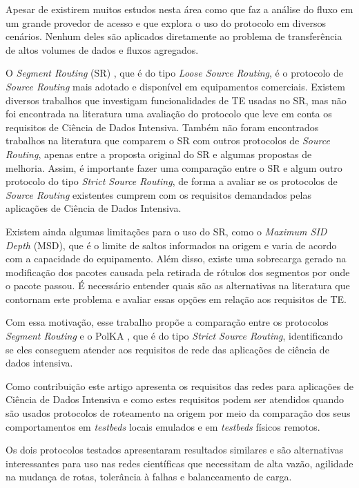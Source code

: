 \documentclass[12pt]{article}
\begin{document}
Apesar de existirem muitos estudos nesta área como \cite{schuller2018traffic} que faz a análise do fluxo em um grande provedor de acesso e \cite{kushwaha2020survey} que explora o uso do protocolo em diversos cenários. Nenhum deles são aplicados diretamente ao problema de transferência de altos volumes de dados e fluxos agregados.
 
O \textit{Segment Routing} (SR) \cite{abdullah2018segment}, que é do tipo \textit{Loose Source Routing}, é o protocolo de \textit{Source Routing} mais adotado e disponível em equipamentos comerciais. Existem diversos trabalhos que investigam funcionalidades de TE usadas no SR, mas não foi encontrada na literatura uma avaliação do protocolo que leve em conta os requisitos de Ciência de Dados Intensiva. 
Também não foram encontrados trabalhos na literatura que comparem o SR com outros protocolos de \textit{Source Routing}, apenas entre a proposta original do SR e algumas propostas de melhoria. 
Assim, é importante fazer uma comparação entre o SR e algum outro protocolo do tipo \textit{Strict Source Routing}, de forma a avaliar se os protocolos de \textit{Source Routing} existentes cumprem com os requisitos demandados pelas aplicações de Ciência de Dados Intensiva.

Existem ainda algumas limitações para o uso do SR, como o \textit{Maximum SID Depth} (MSD), que é o limite de saltos informados na origem e varia de acordo com a capacidade do equipamento. Além disso, existe uma sobrecarga gerado na modificação dos pacotes causada pela retirada de rótulos dos segmentos por onde o pacote passou. É necessário entender quais são as alternativas na literatura que contornam este problema e avaliar essas opções em relação aos requisitos de TE. 

Com essa motivação, esse trabalho propõe a comparação entre os protocolos \textit{Segment Routing} e o PolKA \cite{dominicini2020polka}, que é do tipo \textit{Strict Source Routing}, identificando se eles conseguem atender aos requisitos de rede das aplicações de ciência de dados intensiva.

Como contribuição este artigo apresenta os requisitos das redes para aplicações de Ciência de Dados Intensiva e como estes requisitos podem ser atendidos quando são usados protocolos de roteamento na origem por meio da comparação dos seus comportamentos em \textit{testbeds} locais emulados e em \textit{testbeds} físicos remotos.

Os dois protocolos testados apresentaram resultados similares e são alternativas interessantes para uso nas redes científicas que necessitam de alta vazão, agilidade na mudança de rotas, tolerância à falhas e balanceamento de carga.
\end{document}
